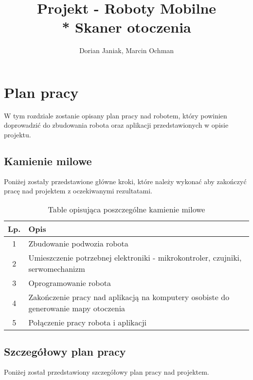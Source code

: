 \documentclass[a4paper]{article}
\title{Projekt - Roboty Mobilne \\* Skaner otoczenia }
\author{Dorian Janiak, Marcin Ochman}
\begin{document}
	\maketitle

	\section{Plan pracy}
	
	W tym rozdziale zostanie opisany plan pracy nad robotem, który powinien doprowadzić do zbudowania robota oraz aplikacji przedstawionych w opisie projektu.
	
	\subsection{Kamienie milowe}
	
	Poniżej zostały przedstawione główne kroki, które należy wykonać aby zakończyć pracę nad projektem z oczekiwanymi rezultatami.
	
	\begin{table}[h]
	\centering
		\begin{tabularx}{0.8\linewidth}{|c|X|}
			\hline
			Lp. & Opis \\ \hline
			1  & Zbudowanie podwozia robota \\ \hline
			2  & Umieszczenie potrzebnej elektroniki - mikrokontroler, czujniki, serwomechanizm  \\ \hline
			3 & Oprogramowanie robota \\ \hline
			4 & Zakończenie pracy nad aplikacją na komputery osobiste do generowanie mapy otoczenia \\ \hline
			5 & Połączenie pracy robota i aplikacji \\ \hline
		\end{tabularx}
		\caption{Table opisująca poszczególne kamienie milowe}
	\end{table}
	
	\subsection{Szczegółowy plan pracy}
	
	Poniżej został przedstawiony szczegółowy plan pracy nad projektem.

\end{document}
